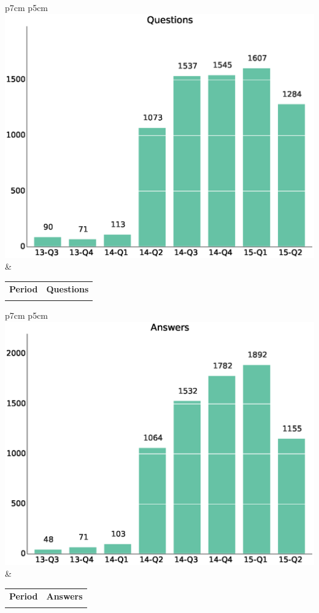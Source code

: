 \documentclass[a4wide,11pt]{report}
\begin{document}
\begin{tabular}{p{7cm} p{5cm}}
    \vspace{0pt} 
    \includegraphics[scale=.35]{figs/questions.eps}
    & 
    \vspace{0pt}
    \begin{tabular}{l|l}%
    \bfseries Period & \bfseries Questions %
    \csvreader[head to column names]{data/questions.csv}{}%
    {\\ & \questions}
    \end{tabular}
\end{tabular}

\begin{tabular}{p{7cm} p{5cm}}
    \vspace{0pt} 
    \includegraphics[scale=.35]{figs/answers.eps}
    & 
    \vspace{0pt}
    \begin{tabular}{l|l}%
    \bfseries Period & \bfseries Answers %
    \csvreader[head to column names]{data/answers.csv}{}%
    {\\ & \answers}
    \end{tabular}
\end{tabular}
\end{document}
